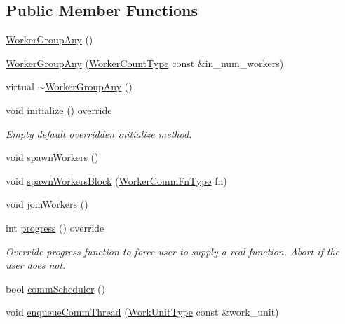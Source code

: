 \subsection*{Public Member Functions}
\begin{DoxyCompactItemize}
\item 
\hyperlink{structvt_1_1worker_1_1_worker_group_any_abe95416ad8e1c0bde799888318491aca}{Worker\+Group\+Any} ()
\item 
\hyperlink{structvt_1_1worker_1_1_worker_group_any_ab3857978c11fd6578d786d0c42a2e784}{Worker\+Group\+Any} (\hyperlink{namespacevt_aa93398ea48f2cb6c188512250f7cc248}{Worker\+Count\+Type} const \&in\+\_\+num\+\_\+workers)
\item 
virtual \hyperlink{structvt_1_1worker_1_1_worker_group_any_a2427146b080679942534b8723475ade3}{$\sim$\+Worker\+Group\+Any} ()
\item 
void \hyperlink{structvt_1_1worker_1_1_worker_group_any_ad8bb855b98bf26337ca13df2bff5fb95}{initialize} () override
\begin{DoxyCompactList}\small\item\em Empty default overridden initialize method. \end{DoxyCompactList}\item 
void \hyperlink{structvt_1_1worker_1_1_worker_group_any_a42edae3e278faf46177ef36719b79e02}{spawn\+Workers} ()
\item 
void \hyperlink{structvt_1_1worker_1_1_worker_group_any_a6175fb131c89db084beda563cf10e4d9}{spawn\+Workers\+Block} (\hyperlink{namespacevt_1_1worker_af5cc6dd44a4444b2e5498ca279a9f04d}{Worker\+Comm\+Fn\+Type} fn)
\item 
void \hyperlink{structvt_1_1worker_1_1_worker_group_any_ac0e40c916ea7620e2985ed29f66a5701}{join\+Workers} ()
\item 
int \hyperlink{structvt_1_1worker_1_1_worker_group_any_a1a2d6dc321514501e00c0373f2583146}{progress} () override
\begin{DoxyCompactList}\small\item\em Override progress function to force user to supply a real function. Abort if the user does not. \end{DoxyCompactList}\item 
bool \hyperlink{structvt_1_1worker_1_1_worker_group_any_ad935117e72318af02e1554be480d3db6}{comm\+Scheduler} ()
\item 
void \hyperlink{structvt_1_1worker_1_1_worker_group_any_a876ea312a8cefa1caa8bbf86caff208d}{enqueue\+Comm\+Thread} (\hyperlink{namespacevt_1_1worker_a59d2fcdafa81fc0af7f921a258e42202}{Work\+Unit\+Type} const \&work\+\_\+unit)

\end{DoxyCompactItemize}
